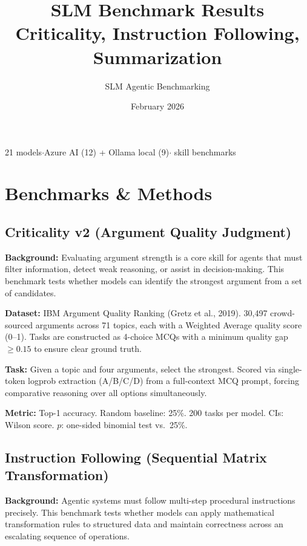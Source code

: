 \documentclass[11pt,a4paper]{article}
\title{\textbf{SLM Benchmark Results}\\[0.3em]
\large Criticality, Instruction Following, Summarization}
\author{SLM Agentic Benchmarking}
\date{February 2026}
\begin{document}
\maketitle
\thispagestyle{empty}

\vspace{-1em}
\begin{center}
\small 21 models\enspace$\cdot$\enspace Azure AI (12) + Ollama local (9)\enspace$\cdot$ skill benchmarks
\end{center}

\section{Benchmarks \& Methods}

\subsection{Criticality v2 (Argument Quality Judgment)}

\textbf{Background:} Evaluating argument strength is a core skill for agents that must filter information, detect weak reasoning, or assist in decision-making. This benchmark tests whether models can identify the strongest argument from a set of candidates.

\textbf{Dataset:} IBM Argument Quality Ranking (Gretz et al., 2019). 30,497 crowd-sourced arguments across 71 topics, each with a Weighted Average quality score (0--1). Tasks are constructed as 4-choice MCQs with a minimum quality gap $\geq 0.15$ to ensure clear ground truth.

\textbf{Task:} Given a topic and four arguments, select the strongest. Scored via single-token logprob extraction (A/B/C/D) from a full-context MCQ prompt, forcing comparative reasoning over all options simultaneously.

\textbf{Metric:} Top-1 accuracy. Random baseline: 25\%. 200 tasks per model. CIs: Wilson score. $p$: one-sided binomial test vs.\ 25\%.

\subsection{Instruction Following (Sequential Matrix Transformation)}

\textbf{Background:} Agentic systems must follow multi-step procedural instructions precisely. This benchmark tests whether models can apply mathematical transformation rules to structured data and maintain correctness across an escalating sequence of operations.
\end{document}
